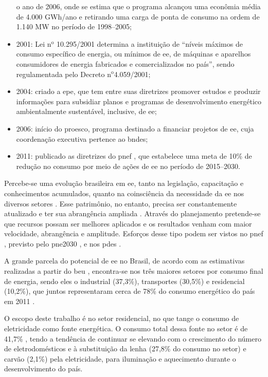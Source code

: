 \begin{itemize}
o ano de 2006, onde se estima que o programa alcançou uma econômia média de 
4.000 GWh/ano e retirando uma carga de ponta de consumo na ordem de 1.140 MW no período de 1998--2005;
\item 2001: Lei n$^\text{o}$ 10.295/2001 determina a instituição de ``níveis
máximos de consumo específico de energia, ou mínimos de \gls{ee},
de máquinas e aparelhos consumidores de energia fabricados e comercializados no
país'', sendo regulamentada pelo Decreto n$^\text{o}$4.059/2001;
\item 2004: criado a \gls{epe}, que tem entre suas diretrizes promover estudos e
produzir informações para subsidiar planos e programas de desenvolvimento
energético ambientalmente sustentável, inclusive, de \gls{ee};
\item 2006: início do \gls{proesco}, programa destinado a financiar projetos de
\gls{ee}, cuja coordenação executiva pertence ao \gls{bndes};
\item 2011: publicado as diretrizes do \gls{pnef} \cite{pnef}, que estabelece uma meta de
10\% de redução no consumo por meio de ações de \gls{ee} no período 
de 2015--2030.
\end{itemize}

Percebe-se uma evolução brasileira em \gls{ee}, tanto na legislação, 
capacitação e conhecimentos acumulados, quanto na 
coinsciência da necessidade da \gls{ee} nos diversos setores \cite{pnef}. 
Esse patrimônio, no entanto, precisa ser constantemente atualizado 
e ter sua abrangência ampliada \cite{pne30_eff_energ}. Através do planejamento pretende-se que
recursos possam ser melhores aplicados e os resultados venham com maior
velocidade, abrangência e amplitude. Esforços desse tipo podem ser vistos no
\gls{pnef} \cite{pnef}, previsto pelo \gls{pne2030} \cite{pne30_eff_energ}, e nos
\glspl{pde} \cite{pde_2012}.

A grande parcela do potencial de \gls{ee} no Brasil, de acordo com as
estimativas realizadas a partir do \gls{beu} \cite{beu}, encontra-se nos três
maiores setores por consumo final de energia, sendo eles o industrial (37,3\%), 
transportes (30,5\%) e residencial (10,2\%), que juntos representaram cerca 
de 78\% do consumo energético do país em 2011 \cite{ben2012,epe_eficiencia_2012}.

O escopo deste trabalho é no setor residencial, no que tange o consumo de eletricidade como
fonte energética. O consumo total dessa fonte no setor é de 41,7\% \cite{ben2012}, 
tendo a tendência de continuar se elevando com o crescimento do número de eletrodomésticos 
e à substituição da lenha (27,8\% do consumo no setor) e carvão (2,1\%) pela eletricidade, 
para iluminação e aquecimento durante o desenvolvimento do país. 


